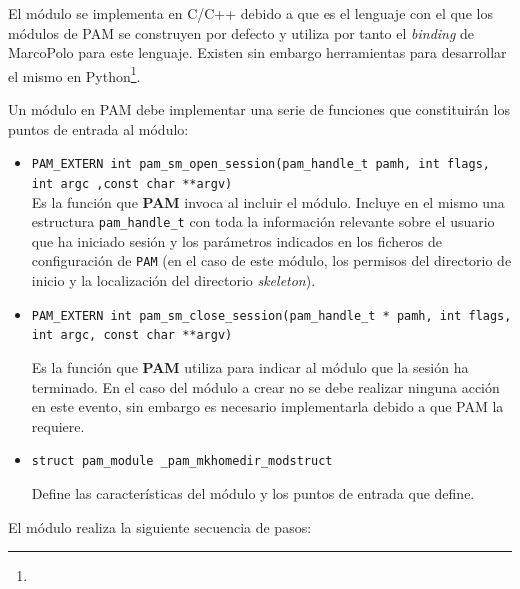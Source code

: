 El módulo se implementa en C/C++ debido a que es el lenguaje con el que los módulos de PAM se construyen por defecto y utiliza por tanto el \textit{binding} de MarcoPolo para este lenguaje. Existen sin embargo herramientas para desarrollar el mismo en Python\footnote{}.

Un módulo en PAM debe implementar una serie de funciones que constituirán los puntos de entrada al módulo:

\begin{itemize}
\item \texttt{PAM\_EXTERN int pam\_sm\_open\_session(pam\_handle\_t \* pamh, int flags, int argc ,const char **argv)}\\

Es la función que \textbf{PAM} invoca al incluir el módulo. Incluye en el mismo una estructura \texttt{pam\_handle\_t} con toda la información relevante sobre el usuario que ha iniciado sesión y los parámetros indicados en los ficheros de configuración de \texttt{PAM} (en el caso de este módulo, los permisos del directorio de inicio y la localización del directorio \textit{skeleton}). 


\item \texttt{PAM\_EXTERN int pam\_sm\_close\_session(pam\_handle\_t * pamh, int flags, int argc, const char **argv)}

Es la función que \textbf{PAM} utiliza para indicar al módulo que la sesión ha terminado. En el caso del módulo a crear no se debe realizar ninguna acción en este evento, sin embargo es necesario implementarla debido a que PAM la requiere.

\item \texttt{struct pam\_module \_pam\_mkhomedir\_modstruct}

Define las características del módulo y los puntos de entrada que define.
\end{itemize}

El módulo realiza la siguiente secuencia de pasos:

